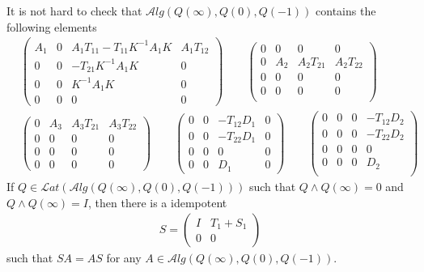 \documentclass[a4paper,10pt]{amsart}
\newcommand{\Lat}{\mathcal Lat}
\newcommand{\Alg}{\mathcal Alg}
\begin{document}
It is not hard to check that $\Alg(Q(\infty), Q(0), Q(-1))$ contains the
following elements 
\begin{align*}
    &\begin{pmatrix}
    A_1 & 0 & A_{1} T_{11}-T_{11}K^{-1}A_{1}K & A_{1}T_{12}\\
       0 & 0 & -T_{21}K^{-1}A_{1}K & 0\\
       0 & 0 & K^{-1}A_{1}K & 0 \\
       0 & 0 & 0 & 0
   \end{pmatrix} \qquad  
   \begin{pmatrix}
   0 & 0 & 0 & 0\\ 
   0 & A_{2} & A_{2}T_{21} & A_{2}T_{22} \\
   0 & 0 & 0 & 0\\ 
   0 & 0 & 0 & 0\\ 
   \end{pmatrix}\\
   &\begin{pmatrix}
   0 & A_{3} & A_{3}T_{21} & A_{3}T_{22}\\ 
   0 & 0 & 0 & 0 \\
   0 & 0 & 0 & 0\\ 
   0 & 0 & 0 & 0 
   \end{pmatrix} \qquad
   \begin{pmatrix}
   0 & 0 &  -T_{12}D_{1} & 0\\ 
   0 & 0 & -T_{22}D_{1} & 0 \\
   0 & 0 & 0 & 0\\ 
   0 & 0 & D_{1} & 0 
   \end{pmatrix} \qquad
   \begin{pmatrix}
   0 & 0 & 0 & -T_{12}D_{2}\\ 
   0 & 0 & 0 & -T_{22}D_{2} \\
   0 & 0 & 0 & 0\\ 
   0 & 0 & 0 & D_{2}\\ 
   \end{pmatrix}
\end{align*}
If $Q \in \Lat(\Alg(Q(\infty), Q(0), Q(-1)))$ such that
$Q \wedge Q(\infty) = 0$ and $Q \wedge Q(\infty) = I$, then there is
a idempotent
\begin{align*}
   S = \begin{pmatrix}
       I & T_{1} + S_{1} \\
       0 & 0
   \end{pmatrix} 
\end{align*}
such that $SA = AS$ for any $A \in \Alg(Q(\infty), Q(0), Q(-1))$. 
\end{document}
